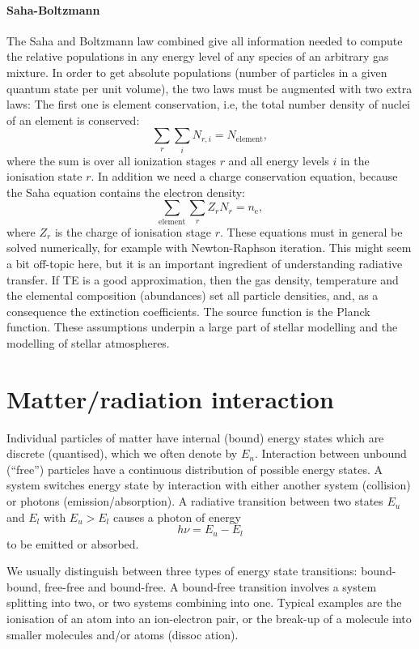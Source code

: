 \documentclass[12pt]{article}
\numberwithin{equation}{section}
\def\nelec{\ensuremath{n_\mathrm{e}}}
\newcommand{\be}{\begin{equation}}
\newcommand{\ee}{\end{equation}}
\begin{document}
\paragraph{Saha-Boltzmann}
The Saha and Boltzmann law combined give all information needed to compute the relative populations in any energy level of any species of an arbitrary gas mixture. In order to get absolute populations (number of particles in a given quantum state per unit volume), the two laws must be augmented with two extra laws: The first one is element conservation, i.e, the total number density of nuclei of an element is conserved:
\be
\sum_r \sum_i N_{r,i} = N_\mathrm{element},
\ee
where the sum is over all ionization stages $r$ and all energy levels $i$ in the ionisation state $r$. In addition we need a charge conservation equation, because the Saha equation contains the electron density:
\be
\sum_\mathrm{element} \sum_r Z_r N_r= \nelec,
\ee
where $Z_r$ is the charge of ionisation stage $r$. These equations must in general be solved numerically, for example with Newton-Raphson iteration. This might seem a bit off-topic here, but it is an important ingredient of understanding radiative transfer. If TE is a good approximation, then the gas density, temperature and the elemental composition (abundances) set all particle densities, and, as a consequence the extinction coefficients. The source function is the Planck function. These assumptions underpin a large part of stellar modelling and the modelling of stellar atmospheres.

\section{Matter/radiation interaction}

Individual particles of matter have internal (bound) energy states which are discrete (quantised), which we often denote by $E_n$. Interaction between unbound (``free'') particles have a continuous distribution of possible energy states. A system switches energy state by interaction with either another system (collision) or photons (emission/absorption). A radiative transition between two states $E_u$ and $E_l$  with $E_u>E_l$ causes a photon of energy 
\be
h \nu = E_u-E_l
\ee
to be emitted or absorbed.

We usually distinguish between three types of energy state transitions: bound-bound, free-free and bound-free. A bound-free transition involves a system splitting into two, or two systems combining into one. Typical examples are the ionisation of an atom into an ion-electron pair, or the break-up of a molecule into smaller molecules and/or atoms (dissoc
ation).
\end{document}
